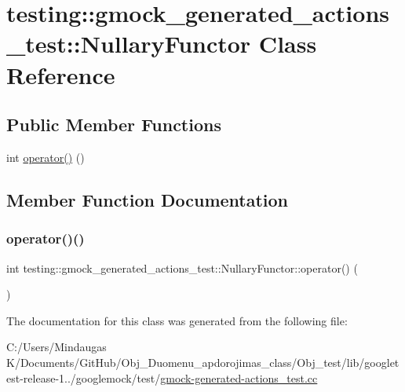 \hypertarget{classtesting_1_1gmock__generated__actions__test_1_1_nullary_functor}{}\section{testing\+::gmock\+\_\+generated\+\_\+actions\+\_\+test\+::Nullary\+Functor Class Reference}
\label{classtesting_1_1gmock__generated__actions__test_1_1_nullary_functor}
\subsection*{Public Member Functions}
\begin{DoxyCompactItemize}
\item 
int \mbox{\hyperlink{classtesting_1_1gmock__generated__actions__test_1_1_nullary_functor_afcf5ace9bbb5a2a91482688bdc20fa07}{operator()}} ()
\end{DoxyCompactItemize}


\subsection{Member Function Documentation}
\mbox{\label{classtesting_1_1gmock__generated__actions__test_1_1_nullary_functor_afcf5ace9bbb5a2a91482688bdc20fa07}} 
\subsubsection{\texorpdfstring{operator()()}{operator()()}}
{\footnotesize\ttfamily int testing\+::gmock\+\_\+generated\+\_\+actions\+\_\+test\+::\+Nullary\+Functor\+::operator() (\begin{DoxyParamCaption}{ }\end{DoxyParamCaption})\hspace{0.3cm}{\ttfamily [inline]}}



The documentation for this class was generated from the following file\+:\begin{DoxyCompactItemize}
\item 
C\+:/\+Users/\+Mindaugas K/\+Documents/\+Git\+Hub/\+Obj\+\_\+\+Duomenu\+\_\+apdorojimas\+\_\+class/\+Obj\+\_\+test/lib/googletest-\/release-\/1../googlemock/test/\mbox{\hyperlink{_obj__test_2lib_2googletest-release-1_88_81_2googlemock_2test_2gmock-generated-actions__test_8cc}{gmock-\/generated-\/actions\+\_\+test.\+cc}}\end{DoxyCompactItemize}
